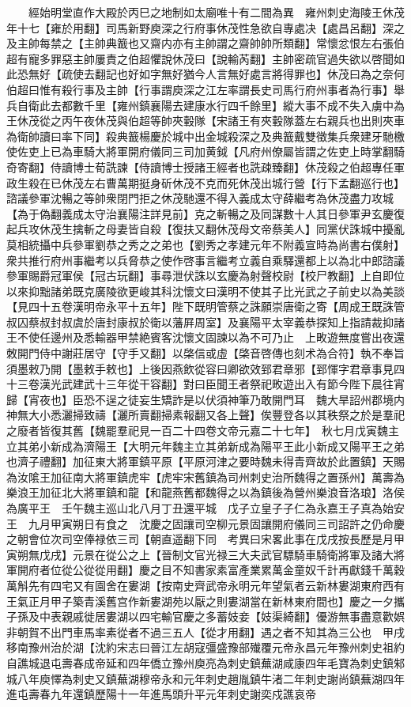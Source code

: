 　　經始明堂直作大殿於丙巳之地制如太廟唯十有二間為異　雍州刺史海陵王休茂年十七【雍於用翻】司馬新野庾深之行府事休茂性急欲自專處决【處昌呂翻】深之及主帥每禁之【主帥典籖也又齋内亦有主帥謂之齋帥帥所類翻】常懷忿恨左右張伯超有寵多罪惡主帥屢責之伯超懼說休茂曰【說輸芮翻】主帥密疏官過失欲以啓聞如此恐無好【疏使去翻記也好如字無好猶今人言無好處言將得罪也】休茂曰為之奈何伯超曰惟有殺行事及主帥【行事謂庾深之江左率謂長史司馬行府州事者為行事】舉兵自衛此去都數千里【雍州鎮襄陽去建康水行四千餘里】縱大事不成不失入虜中為王休茂從之丙午夜休茂與伯超等帥夾轂隊【宋諸王有夾轂隊蓋左右親兵也出則夾車為衛帥讀曰率下同】殺典籖楊慶於城中出金城殺深之及典籖戴雙徵集兵衆建牙馳檄使佐吏上已為車騎大將軍開府儀同三司加黄鉞【凡府州僚屬皆謂之佐吏上時掌翻騎奇寄翻】侍讀博士荀詵諫【侍讀博士授諸王經者也詵疎臻翻】休茂殺之伯超專任軍政生殺在已休茂左右曹萬期挺身斫休茂不克而死休茂出城行營【行下孟翻巡行也】諮議參軍沈暢之等帥衆閉門拒之休茂馳還不得入義成太守薛繼考為休茂盡力攻城【為于偽翻義成太守治襄陽注詳見前】克之斬暢之及同謀數十人其日參軍尹玄慶復起兵攻休茂生擒斬之母妻皆自殺【復扶又翻休茂母文帝蔡美人】同黨伏誅城中擾亂莫相統攝中兵參軍劉恭之秀之之弟也【劉秀之孝建元年不附義宣時為尚書右僕射】衆共推行府州事繼考以兵脅恭之使作啓事言繼考立義自乘驛還都上以為北中郎諮議參軍賜爵冠軍侯【冠古玩翻】事尋泄伏誅以玄慶為射聲校尉【校尸教翻】上自即位以來抑黜諸弟既克廣陵欲更峻其科沈懷文曰漢明不使其子比光武之子前史以為美談【見四十五卷漢明帝永平十五年】陛下既明管蔡之誅願崇唐衛之寄【周成王既誅管叔囚蔡叔封叔虞於唐封康叔於衛以藩屛周室】及襄陽平太宰義恭探知上指請裁抑諸王不使任邊州及悉輸器甲禁絶賓客沈懷文固諫以為不可乃止　上畋遊無度嘗出夜還敇開門侍中謝莊居守【守手又翻】以棨信或虛【棨音啓傳也刻术為合符】執不奉旨須墨敕乃開【墨敕手敕也】上後因燕飲從容曰卿欲效郅君章邪【郅惲字君章事見四十三卷漢光武建武十三年從干容翻】對曰臣聞王者祭祀畋遊出入有節今陛下晨往宵歸【宵夜也】臣恐不逞之徒妄生矯詐是以伏須神筆乃敢開門耳　魏大旱詔州郡境内神無大小悉灑掃致禱【灑所賣翻掃素報翻又各上聲】俟豐登各以其秩祭之於是羣祀之廢者皆復其舊【魏罷羣祀見一百二十四卷文帝元嘉二十七年】　秋七月戊寅魏主立其弟小新成為濟陽王【大明元年魏主立其弟新成為陽平王此小新成又陽平王之弟也濟子禮翻】加征東大將軍鎮平原【平原河津之要時魏未得青齊故於此置鎮】天賜為汝隂王加征南大將軍鎮虎牢【虎牢宋舊鎮為司州刺史治所魏得之置孫州】萬壽為樂浪王加征北大將軍鎮和龍【和龍燕舊都魏得之以為鎮後為營州樂浪音洛琅】洛侯為廣平王　壬午魏主巡山北八月丁丑還平城　戊子立皇子子仁為永嘉王子真為始安王　九月甲寅朔日有食之　沈慶之固讓司空柳元景固讓開府儀同三司詔許之仍命慶之朝會位次司空俸禄依三司【朝直遥翻下同　考異曰宋畧此事在戊戌按長歷是月甲寅朔無戊戌】元景在從公之上【晉制文官光禄三大夫武官驃騎車騎衛將軍及諸大將軍開府者位從公從從用翻】慶之目不知書家素富產業累萬金童奴千計再獻錢千萬穀萬斛先有四宅又有園舍在婁湖【按南史齊武帝永明元年望氣者云新林婁湖東府西有王氣正月甲子築青溪舊宫作新婁湖苑以厭之則婁湖當在新林東府間也】慶之一夕攜子孫及中表親戚徙居婁湖以四宅輸官慶之多蓄妓妾【妓渠綺翻】優游無事盡意歡娯非朝賀不出門車馬率素從者不過三五人【從才用翻】遇之者不知其為三公也　甲戌移南豫州治於湖【沈約宋志曰晉江左胡寇彊盛豫部殱覆元帝永昌元年豫州刺史祖約自譙城退屯壽春成帝延和四年僑立豫州庾亮為刺史鎮蕪湖咸康四年毛寶為刺史鎮邾城八年庾懌為刺史又鎮蕪湖穆帝永和元年刺史趙胤鎮牛渚二年刺史謝尚鎮蕪湖四年進屯壽春九年還鎮歷陽十一年進馬頭升平元年刺史謝奕戍譙哀帝